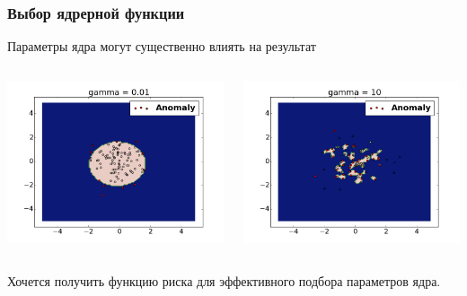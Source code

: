 \documentclass[10pt,pdf]{beamer}
\begin{document}
\begin{frame}\frametitle{Выбор ядрерной функции}
Параметры ядра могут существенно влиять на результат	
\begin{columns}[T]
\begin{column}{6cm}
\includegraphics[scale=0.33]{small_gamma.png}
\end{column}
\begin{column}{6cm}
\includegraphics[scale=0.33]{big_gamma.png}
\end{column}
\end{columns}
Хочется получить функцию риска для эффективного подбора параметров ядра.
\end{frame}
\end{document}
